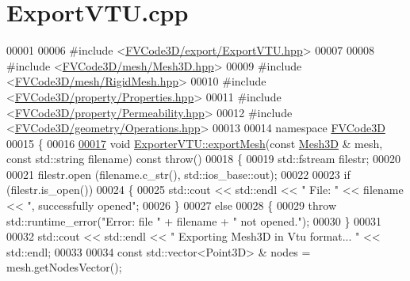 \hypertarget{ExportVTU_8cpp_source}{}\section{Export\+V\+T\+U.\+cpp}
\label{ExportVTU_8cpp_source}

\begin{DoxyCode}
00001 
00006 \textcolor{preprocessor}{#include <\hyperlink{ExportVTU_8hpp}{FVCode3D/export/ExportVTU.hpp}>}
00007 
00008 \textcolor{preprocessor}{#include <\hyperlink{Mesh3D_8hpp}{FVCode3D/mesh/Mesh3D.hpp}>}
00009 \textcolor{preprocessor}{#include <\hyperlink{RigidMesh_8hpp}{FVCode3D/mesh/RigidMesh.hpp}>}
00010 \textcolor{preprocessor}{#include <\hyperlink{Properties_8hpp}{FVCode3D/property/Properties.hpp}>}
00011 \textcolor{preprocessor}{#include <\hyperlink{Permeability_8hpp}{FVCode3D/property/Permeability.hpp}>}
00012 \textcolor{preprocessor}{#include <\hyperlink{Operations_8hpp}{FVCode3D/geometry/Operations.hpp}>}
00013 
00014 \textcolor{keyword}{namespace }\hyperlink{namespaceFVCode3D}{FVCode3D}
00015 \{
00016 
\hypertarget{ExportVTU_8cpp_source.tex_l00017}{}\hyperlink{classFVCode3D_1_1ExporterVTU_a8e5eff8e388cf6de1bf1c1deca863ac7}{00017} \textcolor{keywordtype}{void} \hyperlink{classFVCode3D_1_1ExporterVTU_a8e5eff8e388cf6de1bf1c1deca863ac7}{ExporterVTU::exportMesh}(\textcolor{keyword}{const} \hyperlink{classFVCode3D_1_1Mesh3D}{Mesh3D} & mesh, \textcolor{keyword}{const} std::string filename) \textcolor{keyword}{
      const} \textcolor{keywordflow}{throw}()
00018 \{
00019     std::fstream filestr;
00020 
00021     filestr.open (filename.c\_str(), std::ios\_base::out);
00022 
00023     \textcolor{keywordflow}{if} (filestr.is\_open())
00024     \{
00025         std::cout << std::endl << \textcolor{stringliteral}{" File: "} << filename << \textcolor{stringliteral}{", successfully opened"};
00026     \}
00027     \textcolor{keywordflow}{else}
00028     \{
00029         \textcolor{keywordflow}{throw} std::runtime\_error(\textcolor{stringliteral}{"Error: file "} + filename + \textcolor{stringliteral}{" not opened."});
00030     \}
00031 
00032     std::cout << std::endl << \textcolor{stringliteral}{" Exporting Mesh3D in Vtu format... "} << std::endl;
00033 
00034     \textcolor{keyword}{const} std::vector<Point3D> & nodes = mesh.getNodesVector();

\end{DoxyCode}
